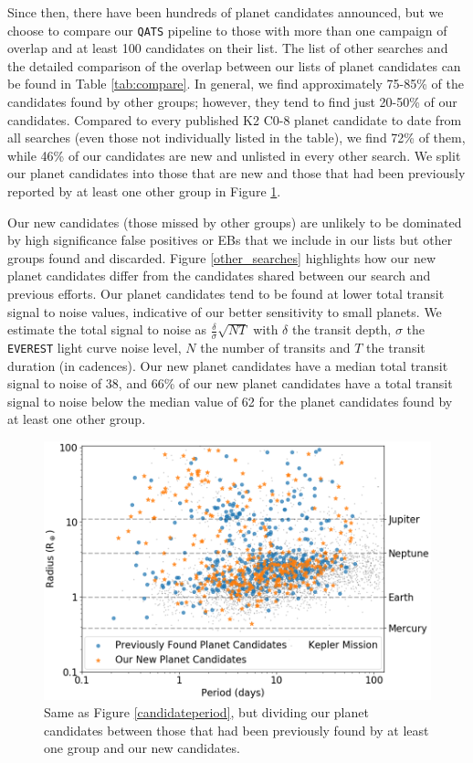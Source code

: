 \documentclass[twocolumn]{aastex62}
\newcommand{\pipeline}[1]{\texttt{#1}}
\newcommand{\myoverlap}{72}
\newcommand{\theirmissing}{46}
\newcommand{\newsn}{38}
\newcommand{\oldsn}{62}
\newcommand{\snbelowold}{66}
\begin{document}
Since then, there have been hundreds of planet candidates announced,
but we choose to compare our \pipeline{QATS} pipeline to those with
more than one campaign of overlap and at least 100 candidates on their
list. The list of other searches and the detailed comparison of the
overlap between our lists of planet candidates can be found in Table
\ref{tab:compare}. In general, we find approximately 75-85\% of the
candidates found by other groups; however, they tend to find just
20-50\% of our candidates. Compared to every published K2 C0-8 planet
candidate to date from all searches (even those not individually
listed in the table), we find \myoverlap{}\% of them, while
\theirmissing{}\% of our candidates are new and unlisted in every
other search. We split our planet candidates into those that are new
and those that had been previously reported by at least one other
group in Figure \ref{candidateperiodnew}.

Our new candidates (those missed by other groups) are unlikely to be
dominated by high significance false positives or EBs that we include
in our lists but other groups found and discarded. Figure
\ref{other_searches} highlights how our new planet candidates differ
from the candidates shared between our search and previous
efforts. Our planet candidates tend to be found at lower total transit
signal to noise values, indicative of our better sensitivity to small
planets. We estimate the total signal to noise as
$\frac{\delta}{\sigma} \sqrt{NT}$ with $\delta$ the transit depth,
$\sigma$ the \pipeline{EVEREST} light curve noise level, $N$ the
number of transits and $T$ the transit duration (in cadences). Our new
planet candidates have a median total transit signal to noise of
\newsn{}, and \snbelowold{}\% of our new planet candidates have a
total transit signal to noise below the median value of \oldsn{} for
the planet candidates found by at least one other group.

\begin{figure}[tbp]
\includegraphics[width=\columnwidth]{candidate_period_rp_new.png}
\caption{Same as Figure \ref{candidateperiod}, but dividing our planet
  candidates between those that had been previously found by at least
  one group and our new candidates. \label{candidateperiodnew}}
\end{figure}
\end{document}
